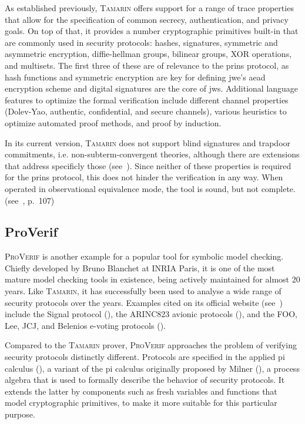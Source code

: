 As established previously, \textsc{Tamarin} offers support for a range of trace properties that allow for the specification of common secrecy, authentication, and privacy goals.
On top of that, it provides a number cryptographic primitives built-in that are commonly used in security protocols: hashes, signatures, symmetric and asymmetric encryption, diffie-hellman groups, bilinear groups, XOR operations, and multisets.
The first three of these are of relevance to the \gls{prins} protocol, as hash functions and symmetric encryption are key for defining \gls{jwe}'s \gls{aead} encryption scheme and digital signatures are the core of \gls{jws}.
Additional language features to optimize the formal verification include different channel properties (Dolev-Yao, authentic, confidential, and secure channels), various heuristics to optimize automated proof methods, and proof by induction.

In its current version, \textsc{Tamarin} does not support blind signatures and trapdoor commitments, i.e. non-subterm-convergent theories, although there are extensions that address specificly those (see~\cite{dreier2017beyond}).
Since neither of these properties is required for the \gls{prins} protocol, this does not hinder the verification in any way.
When operated in observational equivalence mode, the tool is sound, but not complete. (see~\cite{tamarin2019manual}, p.~107)

\subsection{ProVerif}
\label{ssec:proverif}

\textsc{ProVerif} is another example for a popular tool for symbolic model checking.
Chiefly developed by Bruno Blanchet at INRIA Paris, it is one of the most mature model checking tools in existence, being actively maintained for almost 20 years.
Like \textsc{Tamarin}, it has successfully been used to analyse a wide range of security protocols over the years.
Examples cited on its official website (see~\cite{proverif}) include the Signal protocol (\cite{kobeissi2017automated}), the ARINC823 avionic protocols (\cite{blanchet2017symbolic}), and the FOO, Lee, JCJ, and Belenios e-voting protocols (\cite{hirschi2019improving}).

Compared to the \textsc{Tamarin} prover, \textsc{ProVerif} approaches the problem of verifying security protocols distinctly different.
Protocols are specified in the applied pi calculus (\cite{abadi2017applied}), a variant of the pi calculus originally proposed by Milner (\cite{milner1999communicating}), a process algebra that is used to formally describe the behavior of security protocols.
It extends the latter by components such as fresh variables and functions that model cryptographic primitives, to make it more suitable for this particular purpose.

